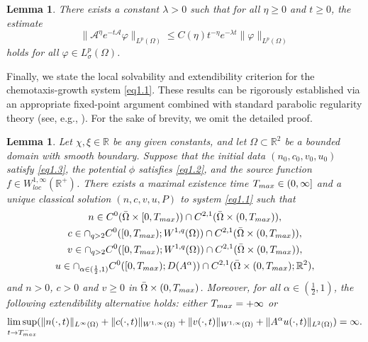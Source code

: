 \documentclass[10pt,a4paper]{amsart}
\numberwithin{equation}{section}
\newtheorem{lemma}[theo]{Lemma}
\begin{document}
\begin{lemma}\label{lem2.7} 
There exists a constant $\lambda > 0$ such that for all $\eta \geq 0$ and $t\geq 0$, 
the estimate
\begin{equation}\label{eq-2.9}
    \|\mathcal{A}^\eta e^{-t\mathcal{A}} \mathcal\varphi\|_{L^p(\Omega)} \leq C(\eta) t^{-\eta} e^{-\lambda t}  \|\varphi\|_{L^p(\Omega)}
\end{equation}
 holds for all $\varphi \in L_\sigma^p(\Omega)$.
\end{lemma}

Finally, we state the local solvability and extendibility criterion for the 
chemotaxis-growth system \eqref{eq1.1}. These results can be rigorously established 
via an appropriate fixed-point argument combined with standard parabolic regularity 
theory (see, e.g., \cite{Winkler2007,Winkler2010}). For the sake of brevity, 
we omit the detailed proof.

\begin{lemma}\label{lm2.8}
Let $\chi, \xi\in \mathbb{R}$ be any given constants, and let
$\Omega \subset \mathbb{R}^2$ be a bounded domain with smooth boundary. 
Suppose that the initial data $(n_0, c_0, v_0 , u_0)$ satisfy
\eqref{eq1.3}, the potential $\phi$ satisfies \eqref{eq1.2}, and the source function 
$f \in W_{loc}^{1,\infty}(\mathbb{R}^+)$. There exists
a maximal existence time $T_{\rm max} \in (0, \infty]$ and a unique classical solution
$(n, c, v, u, P)$ to system \eqref{eq1.1} such that
\begin{gather*}
n \in C^0(\bar{\Omega} \times [0, T_{\rm max})) \cap C^{2, 1}(\bar{\Omega}
 \times (0, T_{\rm max})), \\
c \in \cap_{q > 2} C^0([0, T_{\rm max}); W^{1, q}(\Omega)) \cap C^{2, 1}(\bar{\Omega}
 \times (0, T_{\rm max})), \\
v \in \cap_{q > 2} C^0([0, T_{\rm max}); W^{1, q}(\Omega)) \cap C^{2, 1}(\bar{\Omega}
 \times (0, T_{\rm max})), \\
u \in \cap_{\alpha \in (\frac{1}{2}, 1)} C^0([0, T_{\rm max}); D(A^\alpha)) 
\cap C^{2, 1}(\bar{\Omega} \times (0, T_{\rm max}); \mathbb{R}^2),
\end{gather*}
and $n > 0$, $c > 0$ and $v \geq 0$ in $\bar{\Omega} \times (0, T_{\rm max})$. 
Moreover, for all $\alpha \in (\frac{1}{2}, 1)$, the following extendibility alternative 
holds: either $T_{\rm max} = +\infty$ or
\[
\limsup_{t \to T_{\rm max}^-} ( \|n(\cdot, t)\|_{L^\infty(\Omega)} 
+ \| c(\cdot, t) \|_{W^{1,\infty}(\Omega)} + \|v(\cdot, t)\|_{W^{1,\infty}(\Omega)} +
\|A^\alpha u(\cdot, t)\|_{L^2(\Omega)} ) = \infty.
\]
\end{lemma}
\end{document}
